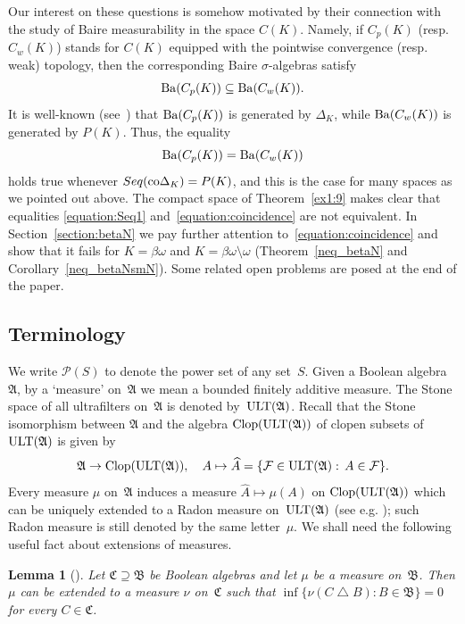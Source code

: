 \documentclass[12pt]{amsart}
\newcommand{\FF}{\protect{\mathcal F}}
\newcommand{\sm}{\setminus}
\newcommand{\sub}{\subseteq}
\newcommand{\Ba}{{\rm Ba}}
\newcommand{\alg}{\mathfrak A}
\newcommand{\algb}{\mathfrak B}
\newcommand{\algc}{\mathfrak C}
\newcommand{\btu}{\bigtriangleup}
\newcommand{\ult}{{\rm ULT}}
\newcommand{\clop}{\protect{\rm Clop} }
\newcommand{\0}{\protect{\bf 0}}
\newcommand{\1}{\protect{\bf 1}}
\newtheorem{lem}[theo]{Lemma}%
\theoremstyle{definition}
\theoremstyle{remark}
\numberwithin{equation}{section}
\begin{document}
Our interest on these questions is somehow motivated by their connection with the study of
Baire measurability in the space $C(K)$. Namely, 
if $C_p(K)$ (resp. $C_w(K)$) stands for $C(K)$ equipped with the pointwise convergence (resp. weak) topology, then
the corresponding Baire $\sigma$-algebras satisfy
$$
	\Ba(C_p(K)) \sub \Ba(C_w(K)).
$$
It is well-known (see~\cite{edg-J}) that $\Ba(C_p(K))$ is generated by $\Delta_K$,
while $\Ba(C_w(K))$ is generated by $P(K)$. Thus, the equality
\begin{equation}\label{equation:coincidence}
	\Ba(C_p(K)) = \Ba(C_w(K))
\end{equation}
holds true whenever $Seq({\rm co}\Delta_K) = P(K)$, and this is the case for many spaces
as we pointed out above. The compact space of Theorem~\ref{ex1:9} makes clear
that equalities \eqref{equation:Seq1} and~\eqref{equation:coincidence} are not equivalent. In Section~\ref{section:betaN}
we pay further attention to~\eqref{equation:coincidence} and 
show that it fails for $K=\beta\omega$ and $K=\beta\omega\sm\omega$ (Theorem~\ref{neq_betaN} and
Corollary~\ref{neq_betaNsmN}). Some related open problems are posed at the end of the paper.



\subsection*{Terminology}

We write $\mathcal{P}(S)$ to denote the power set of any set~$S$.
Given a Boolean algebra~$\alg$, by a `measure' on~$\alg$ we mean a 
bounded finitely additive measure.
The Stone space of all ultrafilters on~$\alg$ is denoted by~$\ult(\alg)$. Recall that the Stone isomorphism
between $\alg$ and the algebra $\clop(\ult(\alg))$ of clopen subsets of $\ult(\alg)$ is given by
$$
	\alg \to \clop(\ult(\alg)), \quad A \mapsto \widehat{A}=\{\FF\in\ult(\alg): \, A\in\FF\}.
$$
Every measure $\mu$ on~$\alg$ induces a measure $\widehat{A} \mapsto \mu(A)$ on $\clop(\ult(\alg))$ which can be uniquely 
extended to a Radon measure on~$\ult(\alg)$ (see e.g. \cite[Chapter~5]{semadeni}); such Radon measure is still denoted by the same letter~$\mu$.
We shall need the following useful fact about extensions of measures. 

\begin{lem}[\cite{Lipecki74,Plachky76}]\label{extensions_of_measures}
Let $\algc\supseteq \algb$ be Boolean algebras and let $\mu$ be a measure on~$\algb$. Then
$\mu$ can be extended to a measure $\nu$ on~$\algc$ such that
$\inf \{\nu(C\btu B): B\in\algb\}=0$ for every $C\in\algc$.
\end{lem}
\end{document}
